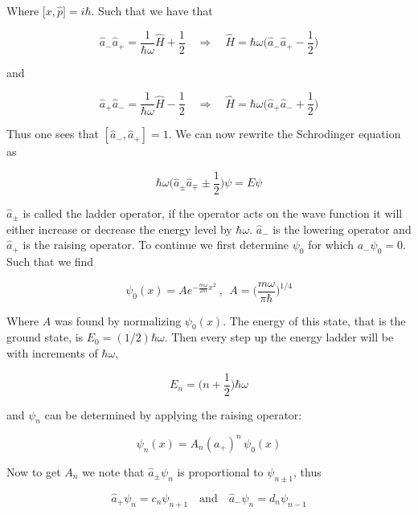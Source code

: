 \documentclass[a4paper]{article}
\begin{document}
Where $\big[x, \hat{p}\big]=i\hbar$. Such that we have that

\begin{equation}
	\hat{a}_-\hat{a}_+=\frac{1}{\hbar\omega}\hat{H}+\frac{1}{2}\quad\Rightarrow\quad\hat{H}=\hbar\omega\bigg(\hat{a}_-\hat{a}_+-\frac{1}{2}\bigg)
\end{equation}

and

\begin{equation}
\hat{a}_+\hat{a}_-=\frac{1}{\hbar\omega}\hat{H}-\frac{1}{2}\quad\Rightarrow\quad\hat{H}=\hbar\omega\bigg(\hat{a}_+\hat{a}_-+\frac{1}{2}\bigg)
\end{equation}
 
Thus one sees that $[\hat{a}_-,\hat{a}_+]=1$. We can now rewrite the Schrodinger equation as

\begin{equation}
	\hbar\omega\bigg(\hat{a}_\pm \hat{a}_\mp\pm\frac{1}{2}\bigg)\psi=E\psi
\end{equation}

$\hat{a}_\pm$ is called the ladder operator, if the operator acts on the wave function it will either increase or decrease the energy level by $\hbar\omega$. $\hat{a}_-$ is the lowering operator and $\hat{a}_+$ is the raising operator. To continue we first determine $\psi_0$ for which $a_-\psi_0=0$. Such that we find

\begin{equation}
	\psi_0(x)=Ae^{-\frac{m\omega}{2m}x^2}\ , \ \ A=\bigg(\frac{m\omega}{\pi\hbar}\bigg)^{1/4}
\end{equation}

Where $A$ was found by normalizing $\psi_0(x)$. The energy of this state, that is the ground state, is $E_0=(1/2)\hbar\omega$. Then every step up the energy ladder will be with increments of $\hbar\omega$,

\begin{equation}
	E_n=\bigg(n+\frac{1}{2}\bigg)\hbar\omega
\end{equation}

and $\psi_n$ can be determined by applying the raising operator:

\begin{equation}
	\psi_n(x)=A_n(a_+)^n\,\psi_0(x)
\end{equation}

Now to get $A_n$ we note that $\hat{a}_\pm\psi_n$ is proportional to $\psi_{n\pm 1}$, thus

\begin{equation}
	\hat{a}_+\psi_n=c_n\psi_{n+1}\quad\text{and}\quad\hat{a}_-\psi_n=d_n\psi_{n-1}
\end{equation}
\end{document}
